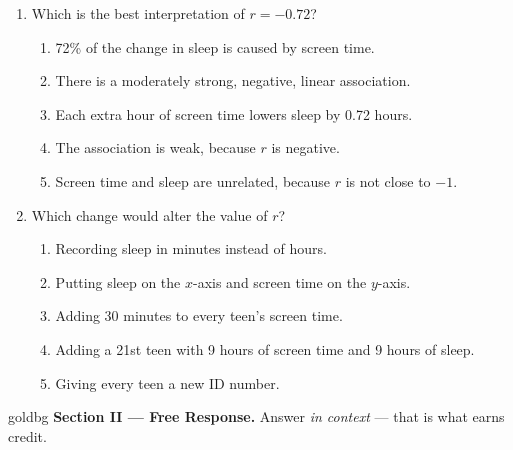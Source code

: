 \documentclass[12pt]{article}
\begin{document}
\begin{enumerate}[leftmargin=1.9em, itemsep=0.06in, topsep=4pt]

  \item Which is the best interpretation of $r = -0.72$?
        \begin{enumerate}[label=\textbf{(\Alph*)}, leftmargin=2.2em, itemsep=0pt, topsep=2pt]
          \item 72\% of the change in sleep is caused by screen time.
          \item There is a moderately strong, negative, linear association.
          \item Each extra hour of screen time lowers sleep by 0.72 hours.
          \item The association is weak, because $r$ is negative.
          \item Screen time and sleep are unrelated, because $r$ is not close to $-1$.
                \hfill{}\rule[-0.2in]{0pt}{0.48in}
        \end{enumerate}

  \item Which change would alter the value of $r$?
        \begin{enumerate}[label=\textbf{(\Alph*)}, leftmargin=2.2em, itemsep=0pt, topsep=2pt]
          \item Recording sleep in minutes instead of hours.
          \item Putting sleep on the $x$-axis and screen time on the $y$-axis.
          \item Adding 30 minutes to every teen's screen time.
          \item Adding a 21st teen with 9 hours of screen time and 9 hours of sleep.
          \item Giving every teen a new ID number.
                \hfill{}\rule[-0.2in]{0pt}{0.48in}
        \end{enumerate}

\end{enumerate}

\vspace{0.04in}

\boxguard[22]
\begin{headlinebox}{goldbg}
\small
\textbf{Section II --- Free Response.} Answer \emph{in context} --- that is what earns
credit.
\end{headlinebox}
\end{document}
